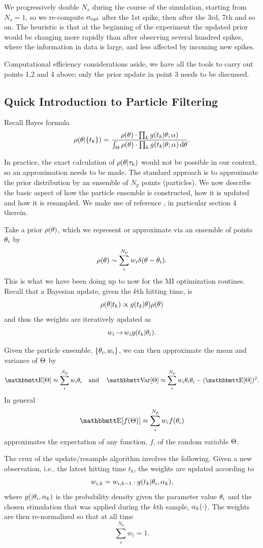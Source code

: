 We progressively double $N_s$ during the course of the simulation, starting
from $N_s=1$, so we re-compute ${\alpha_{opt} }$ after the 1st spike, then after the 3rd, 7th and so on. 
The heuristic is that at the beginning of the experiment the
updated prior would be changing more rapidly than after observing several
hundred spikes, where the information in data is large, and less
affected by incoming new spikes.

Computational efficiency considerations aside, we have all the tools to carry out points
1,2 and 4 above; only the prior update in point 3 needs to be discussed. 

\subsection{Quick Introduction to Particle Filtering}
\label{sec:intro_to_particle_filtering}
Recall Bayes formula
$$
\rho({ \theta}| \{t_k\} ) = 
\frac{  \rho({ \theta}) \cdot \prod_k g(t_k|{ \theta} ; \alpha) }
	 { \int_{\Theta}  \rho({ \theta}) \cdot \prod_k g(t_k|{ \theta} ; \alpha)  \, \mathrm{d} { \theta}}.
$$

In practice, the exact calculation of $\rho({ \theta}|{\tau}_k)$ would not be possible in our
context, so an approximation needs to be made. The standard approach is
to approximate the prior distribution by an ensemble of $N_p$
points (particles). We now describe the basic aspect of how the particle
ensemble is constructed, how it is updated and how it is resampled. We make use of
reference \cite{Granade2012}, in particular section 4 therein.

Take a prior $ \rho({ \theta})$, which we represent or approximate  via an ensemble
of points ${ \theta}_i$ by $$ \rho({ \theta}) \sim \sum_i^{N_p} w_i \delta({ \theta}-{ \theta}_i).$$
This is what we have been doing up to now for the MI optimization routines.
Recall that a Bayesian update, given the $k$th hitting time, is $$
\rho({ \theta}|t_k) \propto g(t_k|{ \theta})\rho({ \theta})$$
and thus the weights are iteratively updated as 
$$w_i \, {\rightarrow} \, w_i g(t_k|{ \theta}_i).$$

Given the particle ensemble, $\{{ \theta}_i, w_i\}$, we can  then approximate the
mean and variance of ${\Theta}$ by
$$ \Exp[\Th] \approx \sum_i^{N_p} w_i \th_i \quad \mbox{and} \quad  \Var[\Th]
\approx \sum_i^{N_p} w_i \th_i \th_i - (\Exp[\Th])^2.$$ 
In general 
$$\Exp[f(\Th)]\approx\sum_i^{N_p} w_i f(\th_i)$$ approximates the expectation
of any function, $f$, of the random variable ${\Theta}$.

The crux of the update/resample algorithm involves the
following. Given a new observation, i.e.,  the latest hitting time $t_k$, the weights are updated according to
$$ w_{i,k} = w_{i,k-1}\cdot g(t_k| { \theta}_i, \alpha_k),$$
where $g(|{ \theta}_i, \alpha_k)$ is
the probability density given the parameter value ${ \theta}_i$ and the chosen
stimulation that was applied during the $k$th sample, $\alpha_k(\cdot)$.
The weights are then re-normalized so that at all time $$\sum_i^{N_p} w_i = 1.$$ 


